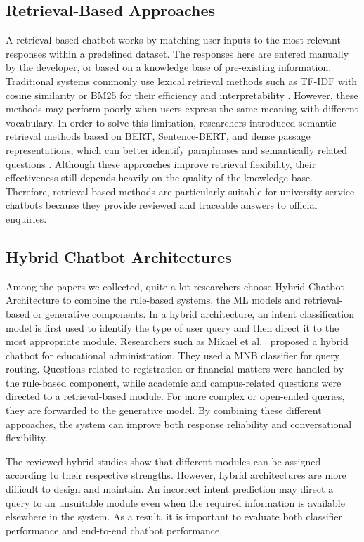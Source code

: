\documentclass[12pt,a4paper]{article}
\begin{document}
\subsection{Retrieval-Based Approaches}

A retrieval-based chatbot works by matching user inputs to the most relevant responses within a predefined dataset. The responses here are entered manually by the developer, or based on a knowledge base of pre-existing information. Traditional systems commonly use lexical retrieval methods such as TF-IDF with cosine similarity or BM25 for their efficiency and interpretability \cite{salton1988,robertson2009}. However, these methods may perform poorly when users express the same meaning with different vocabulary. In order to solve this limitation, researchers introduced semantic retrieval methods based on BERT, Sentence-BERT, and dense passage representations, which can better identify paraphrases and semantically related questions \cite{sakata2019,reimers2019,karpukhin2020}. Although these approaches improve retrieval flexibility, their effectiveness still depends heavily on the quality of the knowledge base. Therefore, retrieval-based methods are particularly suitable for university service chatbots because they provide reviewed and traceable answers to official enquiries.

\subsection{Hybrid Chatbot Architectures}

Among the papers we collected, quite a lot researchers choose Hybrid Chatbot Architecture to combine the rule-based systems, the ML models and retrieval-based or generative components. In a hybrid architecture, an intent classification model is first used to identify the type of user query and then direct it to the most appropriate module. Researchers such as Mikael et al.\ \cite{mikael2025} proposed a hybrid chatbot for educational administration. They used a MNB classifier for query routing. Questions related to registration or financial matters were handled by the rule-based component, while academic and campus-related questions were directed to a retrieval-based module. For more complex or open-ended queries, they are forwarded to the generative model. By combining these different approaches, the system can improve both response reliability and conversational flexibility.

The reviewed hybrid studies show that different modules can be assigned according to their respective strengths. However, hybrid architectures are more difficult to design and maintain. An incorrect intent prediction may direct a query to an unsuitable module even when the required information is available elsewhere in the system. As a result, it is important to evaluate both classifier performance and end-to-end chatbot performance.
\end{document}
